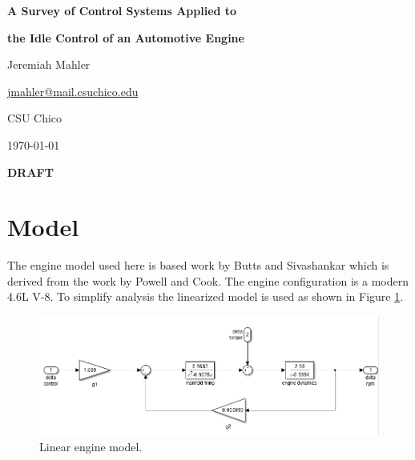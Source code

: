 \documentclass{article}
\begin{document}

\thispagestyle{empty}

\centerline{\Large \textbf{A Survey of Control Systems Applied to}}
\centerline{\Large \textbf{the Idle Control of an Automotive Engine}}
\vspace{0.1in}
\centerline{\normalsize {Jeremiah Mahler}}
\centerline{\small {\href{mailto:jmahler@mail.csuchico.edu}{jmahler@mail.csuchico.edu}} }
\vspace{0.1in}
\centerline{\normalsize {CSU Chico}}
\centerline{\small \today}
\vspace{0.2in}
\centerline{\LARGE \textbf{DRAFT}}
\vspace{0.2in}






\section{Model}

The engine model used here is based work
by Butts and Sivashankar\autocite{532315} which is derived from
the work by Powell and Cook\autocite{4789342}.
The engine configuration is a modern 4.6L V-8.
To simplify analysis the linearized model is used as shown in
Figure \ref{fig:lem}.

\begin{figure}[hbp!]
\begin{center}
\includegraphics[scale=0.6]{img/schematic-linear_engine_model-ed1}
\end{center}
\caption{Linear engine model.}\label{fig:lem}
\end{figure}
\end{document}
